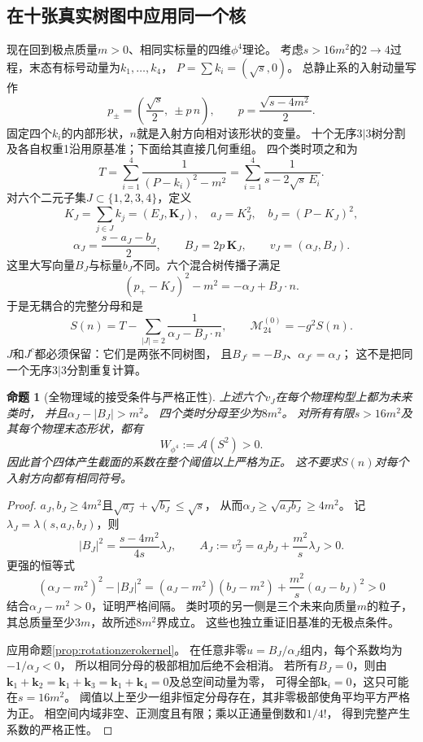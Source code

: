\documentclass[11pt,a4paper]{ctexart}
\theoremstyle{cnplain}\newtheorem{theorem}{定理}[section]
\newtheorem{proposition}[theorem]{命题}
\theoremstyle{definition}\newtheorem{definition}[theorem]{定义}
\theoremstyle{remark}\newtheorem{remark}[theorem]{注}
\begin{document}
\subsection{在十张真实树图中应用同一个核}
现在回到极点质量$m>0$、相同实标量的四维$\phi^4$理论。
考虑$s>16m^2$的$2\to4$过程，末态有标号动量为$k_1,\ldots,k_4$，
$P=\sum k_i=(\sqrt s,0)$。
总静止系的入射动量写作
\[
 p_\pm=\left(\frac{\sqrt s}{2},\ \pm p\,n\right),\qquad
 p=\frac{\sqrt{s-4m^2}}2.
\]
固定四个$k_i$的内部形状，$n$就是入射方向相对该形状的变量。
十个无序$3|3$树分割及各自权重1沿用原基准；下面给其直接几何重组。
四个类时项之和为
\[
 T=\sum_{i=1}^4\frac1{(P-k_i)^2-m^2}
   =\sum_{i=1}^4\frac1{s-2\sqrt s\,E_i}.
\]
对六个二元子集$J\subset\{1,2,3,4\}$，定义
\[
 K_J=\sum_{j\in J}k_j=(E_J,\mathbf K_J),\quad
 a_J=K_J^2,\quad b_J=(P-K_J)^2,
\]
\[
 \alpha_J=\frac{s-a_J-b_J}{2},\qquad
 B_J=2p\,\mathbf K_J,\qquad
 v_J=(\alpha_J,B_J).
\]
这里大写向量$B_J$与标量$b_J$不同。六个混合树传播子满足
\[
 (p_+-K_J)^2-m^2=-\alpha_J+B_J\cdot n.
\]
于是无耦合的完整分母和是
\[
 S(n)=T-\sum_{|J|=2}\frac1{\alpha_J-B_J\cdot n},
 \qquad \mathcal M_{24}^{(0)}=-g^2S(n).
 \tag{RT}\label{eq:rotationphi4}
\]
$J$和$J^c$都必须保留：它们是两张不同树图，
且$B_{J^c}=-B_J$、$\alpha_{J^c}=\alpha_J$；
这不是把同一个无序$3|3$分割重复计算。

\begin{proposition}[全物理域的接受条件与严格正性]\label{prop:rotationphi4positive}
上述六个$v_J$在每个物理构型上都为未来类时，
并且$\alpha_J-|B_J|>m^2$。
四个类时分母至少为$8m^2$。
对所有有限$s>16m^2$及其每个物理末态形状，都有
\[
 W_{\phi^4}:=\mathcal A(S^2)>0.
 \tag{R+}\label{eq:rotationpositive}
\]
因此首个四体产生截面的系数在整个阈值以上严格为正。
这不要求$S(n)$对每个入射方向都有相同符号。
\end{proposition}
\begin{proof}
$a_J,b_J\ge4m^2$且$\sqrt{a_J}+\sqrt{b_J}\le\sqrt s$，
从而$\alpha_J\ge\sqrt{a_Jb_J}\ge4m^2$。
记$\lambda_J=\lambda(s,a_J,b_J)$，则
\[
 |B_J|^2=\frac{s-4m^2}{4s}\lambda_J,\qquad
 A_J:=v_J^2=a_Jb_J+\frac{m^2}{s}\lambda_J>0.
\]
更强的恒等式
\[
 (\alpha_J-m^2)^2-|B_J|^2
 =(a_J-m^2)(b_J-m^2)+\frac{m^2}{s}(a_J-b_J)^2>0
\]
结合$\alpha_J-m^2>0$，证明严格间隔。
类时项的另一侧是三个未来向质量$m$的粒子，
其总质量至少$3m$，故所述$8m^2$界成立。
这些也独立重证旧基准的无极点条件。

应用命题\ref{prop:rotationzerokernel}。
在任意非零$u=B_J/\alpha_J$组内，每个系数均为$-1/\alpha_J<0$，
所以相同分母的极部相加后绝不会相消。
若所有$B_J=0$，则由
$\mathbf k_1+\mathbf k_2=\mathbf k_1+\mathbf k_3=
\mathbf k_1+\mathbf k_4=0$及总空间动量为零，
可得全部$\mathbf k_i=0$，这只可能在$s=16m^2$。
阈值以上至少一组非恒定分母存在，其非零极部使角平均平方严格为正。
相空间内域非空、正测度且有限；乘以正通量倒数和$1/4!$，
得到完整产生系数的严格正性。
\end{proof}
\end{document}
